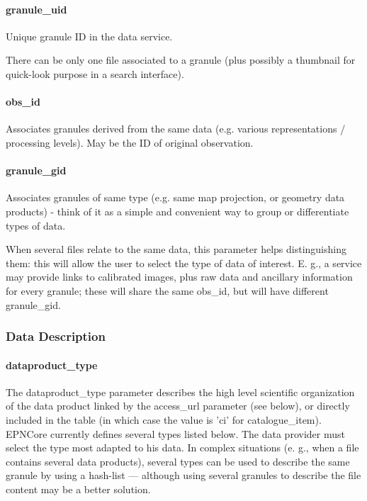 \documentclass[11pt,a4paper]{ivoa}
\begin{document}
\paragraph{granule\_uid}

Unique granule ID in the data service.

There can be only one file associated to a granule (plus possibly a thumbnail for quick-look purpose in a search interface).

\paragraph{obs\_id}

Associates granules derived from the same data (e.g. various representations / processing levels). May be the ID of original observation.

\paragraph{granule\_gid}

Associates granules of same type (e.g. same map projection, or geometry data products) - think of it as a simple and convenient way to group or differentiate types of data.

When several files relate to the same data, this parameter helps distinguishing them: this will allow the user to select the type of data of interest. E. g., a service may provide links to calibrated images, plus raw data and ancillary information for every granule; these will share the same obs\_id, but will have different granule\_gid.

\subsubsection{Data Description}

\paragraph{dataproduct\_type}

The dataproduct\_type parameter describes the high level scientific organization of the data product linked by the access\_url parameter (see below), or directly included in the table (in which case the value is 'ci' for catalogue\_item). EPNCore currently defines several types listed below. The data provider must select the type most adapted to his data. In complex situations (e. g., when a file contains several data products), several types can be used to describe the same granule by using a hash-list — although using several granules to describe the file content may be a better solution.  
\end{document}
